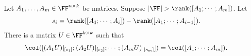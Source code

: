 \begin{lemma}\label{lem:max-rank-induction}
    Let $A_1, \ldots, A_m \in \FF^{n \times k}$ be matrices. Suppose $|\FF| > \rank([A_1; \cdots; A_m])$. Let 
    \[
    s_i = \rank([A_1; \cdots ; A_{i}]) - \rank([A_1; \cdots ; A_{i-1}]).
    \]
    There is a matrix $U \in \FF^{k \times k}$ such that
\begin{equation}\label{eq:cspan2}
    \col([(A_1 U)|_{[s_1]} ; (A_2 U)|_{[s_2]} ; \cdots ; (A_m U)|_{[s_m]}]) = \col([A_1; \cdots ; A_m]).
\end{equation}
\end{lemma}


